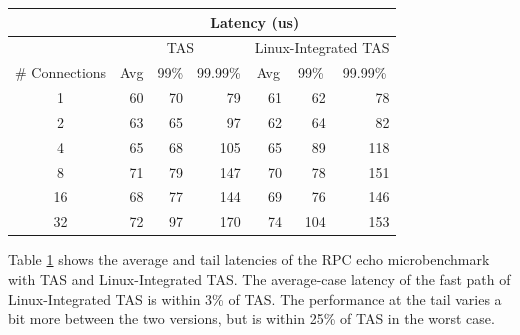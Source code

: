 \begin{table}[]
\begin{tabular}{@{}crrrrrr@{}}
\toprule
               & \multicolumn{6}{c}{Latency (us)}                                                                                                                                    \\ \midrule
               & \multicolumn{3}{c}{TAS}                                                          & \multicolumn{3}{c}{Linux-Integrated TAS}                                         \\
\# Connections & \multicolumn{1}{c}{Avg} & \multicolumn{1}{c}{99\%} & \multicolumn{1}{c}{99.99\%} & \multicolumn{1}{c}{Avg} & \multicolumn{1}{c}{99\%} & \multicolumn{1}{c}{99.99\%} \\
1              & 60                      & 70                       & 79                          & 61                      & 62                       & 78                          \\
2              & 63                      & 65                       & 97                          & 62                      & 64                       & 82                          \\
4              & 65                      & 68                       & 105                         & 65                      & 89                       & 118                         \\
8              & 71                      & 79                       & 147                         & 70                      & 78                       & 151                         \\
16             & 68                      & 77                       & 144                         & 69                      & 76                       & 146                         \\
32             & 72                      & 97                       & 170                         & 74                      & 104                      & 153                         \\ \bottomrule
\end{tabular}
\label{fastpath-latency}
\end{table}

Table \ref{fastpath-latency} shows the average and tail latencies of the RPC 
echo microbenchmark with TAS and Linux-Integrated TAS. The average-case latency
of the fast path of Linux-Integrated TAS is within 3\% of TAS. The performance 
at the tail varies a bit more between the two versions, but is within 25\% of 
TAS in the worst case.

